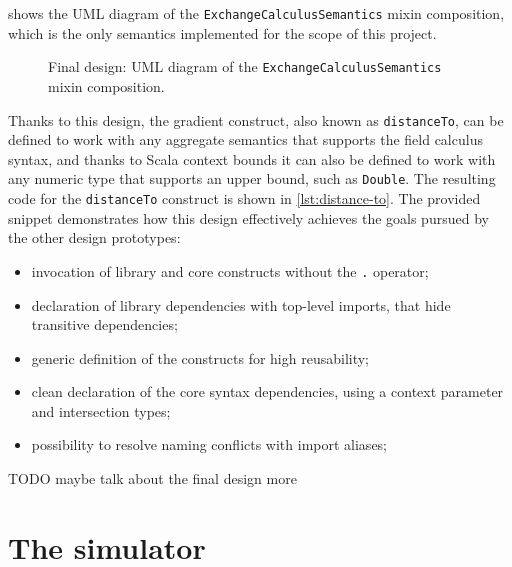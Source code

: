  shows the \ac{UML} diagram of the \texttt{ExchangeCalculusSemantics} mixin composition, which is the only semantics implemented for the scope of this project.

\begin{figure}
    \centering
    \caption{Final design: \ac{UML} diagram of the \texttt{ExchangeCalculusSemantics} mixin composition.}
    \label{fig:final-design-exchange-calculus-semantics-diagram}
    \bigskip
    \resizebox{\linewidth}{!}{
        
    }
\end{figure}

Thanks to this design, the gradient construct, also known as \texttt{distanceTo}, can be defined to work with any aggregate semantics that supports the field calculus syntax, and thanks to Scala context bounds it can also be defined to work with any numeric type that supports an upper bound, such as \texttt{Double}.
%
The resulting code for the \texttt{distanceTo} construct is shown in \cref{lst:distance-to}.
%
The provided snippet demonstrates how this design effectively achieves the goals pursued by the other design prototypes:
\begin{itemize}
    \item invocation of library and core constructs without the \texttt{.} operator;
    \item declaration of library dependencies with top-level imports, that hide transitive dependencies;
    \item generic definition of the constructs for high reusability;
    \item clean declaration of the core syntax dependencies, using a  context parameter and intersection types;
    \item possibility to resolve naming conflicts with import aliases;
\end{itemize}



TODO maybe talk about the final design more

\section{The simulator}


